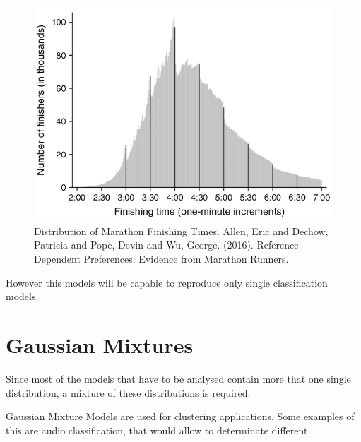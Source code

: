 \documentclass[conference]{IEEEtran}
\begin{document}
\begin{figure}[h]
	\label{fig:race}
	\includegraphics[scale=0.48]{imgs/race.png}
	\caption{Distribution of Marathon Finishing Times. Allen, Eric and Dechow, Patricia and Pope, Devin and Wu, George. (2016). Reference-Dependent Preferences: Evidence from Marathon Runners.}
\end{figure}

However this models will be capable to reproduce only single classification models.

\section{Gaussian Mixtures} \label{gmixtures}

Since most of the models that have to be analysed contain more that one single distribution, a mixture of these distributions is required.

Gaussian Mixture Models are used for clustering applications. Some examples of this are audio classification, that would allow to determinate different  

%
%
\end{document}
